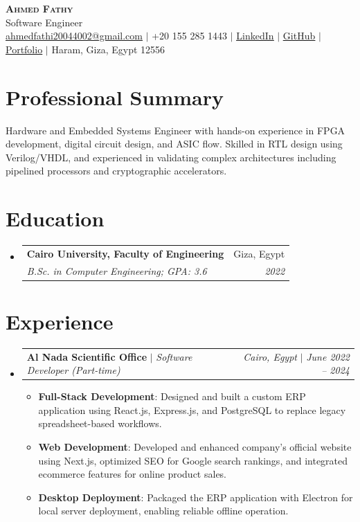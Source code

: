 \documentclass[letterpaper,11pt]{article}
\makeatletter
\newcommand{\resumeItem}[2]{\item\small{\textbf{#1}{: #2 \vspace{-2pt}}}}
\newcommand{\resumeSubheading}[4]{
  \vspace{-1pt}\item
    \begin{tabular*}{0.97\textwidth}{l@{\extracolsep{\fill}}r}
      \textbf{#1} & #2 \\
      \textit{\small#3} & \textit{\small #4} \\
    \end{tabular*}\vspace{-5pt}
}
\newcommand{\resumeActivitySubheading}[4]{
  \vspace{-1pt}\item
    \begin{tabular*}{0.97\textwidth}{l@{\extracolsep{\fill}}r}
      \textbf{#1} $|$ \textit{\small#3} & \textit{\small#2} $|$ \textit{\small #4} \\
    \end{tabular*}\vspace{-5pt}
}
\newcommand{\resumeSubHeadingListStart}{\begin{itemize}[leftmargin=*]}
\newcommand{\resumeSubHeadingListEnd}{\end{itemize}}
\newcommand{\resumeItemListStart}{\begin{itemize}}
\newcommand{\resumeItemListEnd}{\end{itemize}\vspace{-5pt}}
\makeatother
\begin{document}
\begin{center}
    \textbf{\Huge \scshape Ahmed Fathy} \\ \vspace{1pt}
    \small Software Engineer \\
    \href{mailto:ahmedfathi20044002@gmail.com}{\underline{ahmedfathi20044002@gmail.com}} $|$
    +20 155 285 1443 $|$
    \href{https://www.linkedin.com/in/ahmedfathy-x1}{\underline{LinkedIn}} $|$
    \href{https://github.com/ahmedfathy0-0}{\underline{GitHub}} $|$
    \href{https://www.mrfathi.tech/}{\underline{Portfolio}} $|$
    Haram, Giza, Egypt 12556
\end{center}


\section{Professional Summary}
  \small Hardware and Embedded Systems Engineer with hands-on experience in FPGA development, digital circuit design, and ASIC flow. Skilled in RTL design using Verilog/VHDL, and experienced in validating complex architectures including pipelined processors and cryptographic accelerators.
  \vspace{8pt}
\section{Education}
  \resumeSubHeadingListStart
    \resumeSubheading
      {Cairo University, Faculty of Engineering}{Giza, Egypt}
      {B.Sc. in Computer Engineering;  GPA: 3.6}{2022}
  \resumeSubHeadingListEnd
\section{Experience}
  \resumeSubHeadingListStart
    \resumeActivitySubheading
      {Al Nada Scientific Office}{Cairo, Egypt}{Software Developer (Part-time)}{June 2022 -- 2024}
      \resumeItemListStart
        \resumeItem{Full-Stack Development}
          {Designed and built a custom ERP application using React.js, Express.js, and PostgreSQL to replace legacy spreadsheet-based workflows.}
        \resumeItem{Web Development}
          {Developed and enhanced company's official website using Next.js, optimized SEO for Google search rankings, and integrated ecommerce features for online product sales.}
        \resumeItem{Desktop Deployment}
          {Packaged the ERP application with Electron for local server deployment, enabling reliable offline operation.}
      \resumeItemListEnd
  \resumeSubHeadingListEnd
\end{document}
